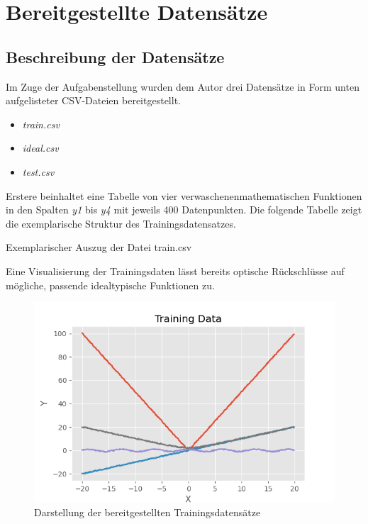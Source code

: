 \section{Bereitgestellte Datensätze}

\subsection{Beschreibung der Datensätze}

Im Zuge der Aufgabenstellung wurden dem Autor drei Datensätze in Form unten aufgelisteter CSV-Dateien bereitgestellt.

\begin{itemize}
 \itemsep0pt
 \item \emph{train.csv}
 \item \emph{ideal.csv}
 \item \emph{test.csv}
\end{itemize}

Erstere beinhaltet eine Tabelle von vier \glqq verwaschenen\grqq mathematischen Funktionen in den Spalten \emph{y1} bis \emph{y4} mit jeweils 400 Datenpunkten. Die folgende Tabelle zeigt die exemplarische Struktur des Trainingsdatensatzes.

\begin{table}[H]
\small
\centering
{}
\caption{Exemplarischer Auszug der Datei train.csv}
\label{tab:train.csv}
\end{table} 


Eine Visualisierung der Trainingsdaten lässt bereits optische Rückschlüsse auf mögliche, passende idealtypische Funktionen zu.
\begin{figure}[h]
\centering
\includegraphics[width=13cm]{../output/figures/train.png}
\caption{Darstellung der bereitgestellten Trainingsdatensätze}
\label{fig:train}
\end{figure}

